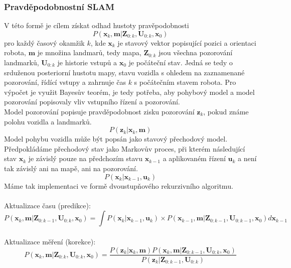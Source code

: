 \documentclass[12pt]{article}
\begin{document}
\subsubsection{Pravděpodobnostní SLAM}
V této formě je cílem získat odhad hustoty pravěpodobnosti
\begin{equation}
	P(\textbf{x}_k,\textbf{m}|\textbf{Z}_{0:k},\textbf{U}_{0:k},\textbf{x}_0)
\end{equation}
pro každý časový okamžik ${k}$, kde $\textbf{x}_k$ je stavový vektor popisující pozici a orientaci robota, $\textbf{m}$ je množina landmarů, tedy mapa, $\textbf{Z}_{0:k}$ jsou všechna pozorování landmarků, $\textbf{U}_{0:k}$ je historie vstupů a $\textbf{x}_0$ je počáteční stav. Jedná se tedy o srduženou posteriorní hustotu mapy, stavu vozidla s ohledem na zaznamenané pozorování, řídící vstupy a zahrnuje čas ${k}$ s počátečním stavem robota. Pro výpočet je využit Bayesův teorém, je tedy potřeba, aby pohybový model a model pozorování popisovaly vliv vstupního řízení a pozorování.\\
\indent Model pozorování popisuje pravděpodobnost zisku pozorování $\textbf{z}_k$, pokud známe polohu vozidla a landmarků.
\begin{equation}
	P(\textbf{z}_k|\textbf{x}_k,\textbf{m})
\end{equation} 
\indent Model pohybu vozidla může být popsán jako stavový přechodový model. \\Předpokládáme přechodový stav jako Markovův proces, při kterém následující stav $\textbf{x}_k$ je závislý pouze na předchozím stavu $\textbf{x}_{k-1}$ a aplikovaném řízení $\textbf{u}_k$ a není tak závislý ani na mapě, ani na pozorování.
\begin{equation}
	P(\textbf{x}_k|\textbf{x}_{k-1},\textbf{u}_k)
\end{equation}
Máme tak implementaci ve formě dvoustupňového rekurzivního algoritmu.\\
\\
Aktualizace času (predikce):
\begin{equation}
	P(\textbf{x}_k,\textbf{m}|\textbf{Z}_{0:k-1},\textbf{U}_{0:k},\textbf{x}_0)=\int P(\textbf{x}_k|\textbf{x}_{k-1},\textbf{u}_k)\times P(\textbf{x}_{k-1},\textbf{m}|\textbf{Z}_{0:k-1},\textbf{U}_{0:k-1},\textbf{x}_0)d\textbf{x}_{k-1}
\end{equation}
\\
Aktualizace měření (korekce):
\begin{equation}
	P(\textbf{x}_k,\textbf{m}|\textbf{Z}_{0:k},\textbf{U}_{0:k},\textbf{x}_0)=\frac{P(\textbf{z}_k|\textbf{x}_k,\textbf{m})P(\textbf{x}_k,\textbf{m}|\textbf{Z}_{0:k-1},\textbf{U}_{0:k},\textbf{x}_0)}{P(\textbf{z}_k|\textbf{Z}_{0:k-1},\textbf{U}_{0:k})}
\end{equation}
\end{document}
